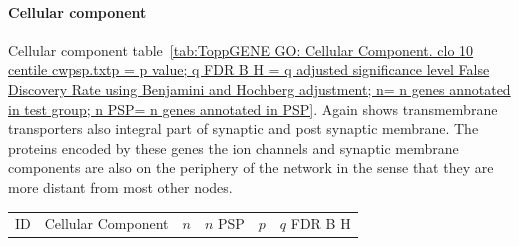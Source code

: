 \paragraph{Cellular component}
Cellular component table~\ref{tab:ToppGENE GO: Cellular Component. clo 10 centile cwpsp.txtp = p value; q FDR B H = q adjusted significance level False Discovery Rate using Benjamini and Hochberg adjustment; n= n genes annotated in test group; n PSP= n genes annotated in PSP}. Again shows transmembrane transporters also integral part of synaptic and post synaptic membrane. The proteins encoded by these genes the ion channels and synaptic membrane components are also on the periphery of the network in the sense that they are more distant from most other nodes.




  \begin{table}[ht]
\centering
\begin{adjustbox}{width=\textwidth}
\setlength{\extrarowheight}{2pt}
\begin{tabular}{@{}clllcl@{}}
  \toprule
  ID & Cellular Component & $n$ & $n$ PSP & $p$ & $q$ FDR B H \\ 


\end{tabular}
\end{adjustbox}
\end{table}
